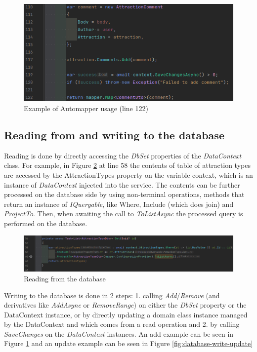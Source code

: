 \begin{figure}[!ht]
    \centering
    \includegraphics[width=1\linewidth]{4.3.2_automapper-usage.png}
    \caption{Example of Automapper usage (line 122)}
    \label{fig:automapper-usage}
\end{figure}


\subsection{Reading from and writing to the database}

\par Reading is done by directly accessing the \textit{DbSet} properties of the \textit{DataContext} class. For example, in Figure \ref{fig:database-read} at line 58 the contents of table of attraction types are accessed by the AttractionTypes property on the variable context, which is an instance of \textit{DataContext} injected into the service. The contents can be further processed on the database side by using non-terminal operations, methods that return an instance of \textit{IQueryable}, like Where, Include (which does join) and \textit{ProjectTo}. Then, when awaiting the call to \textit{ToListAsync} the processed query is performed on the database.

\begin{figure}[!ht]
    \centering
    \includegraphics[width=1\linewidth]{4.3.3_database-read.png}
    \caption{Reading from the database}
    \label{fig:database-read}
\end{figure}

\par Writing to the database is done in 2 steps: 1. calling \textit{Add}/\textit{Remove} (and derivatives like \textit{AddAsync} or \textit{RemoveRange}) on either the \textit{DbSet} property or the DataContext instance, or by directly updating a domain class instance managed by the DataContext and which comes from a read operation and 2. by calling \textit{SaveChanges} on the \textit{DataContext} instances. An add example can be seen in Figure \ref{fig:automapper-usage} and an update example can be seen in Figure \ref{fig:database-write-update}

